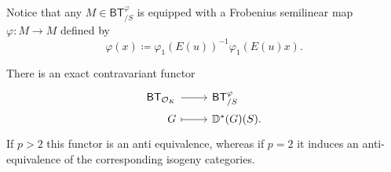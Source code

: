 \documentclass[../Main]{subfiles}
\begin{document}
\noindent
Notice that any $M \in \mathsf{BT}^{\varphi}_{/S}$ is equipped with a Frobenius
semilinear map $\varphi\colon M \to M$ defined by
\begin{equation*}
	\varphi (x) \coloneqq \varphi_1 \left( E(u) \right)^{-1} \varphi_1 (E(u)x)
.\end{equation*}


\begin{prop}
	There is an exact contravariant functor
	\begin{equation*}
	\begin{tikzcd}[row sep = 0ex
		,/tikz/column 1/.append style={anchor=base east}
		,/tikz/column 2/.append style={anchor=base west}]
		\mathsf{BT}_{\mathcal{O}_{ K }} \arrow[r, "", rightarrow] &
		\mathsf{BT}^{\varphi}_{/S} \\
		G \arrow[r, "", mapsto] & 
		\mathbb{D}^*(G)(S)
	.\end{tikzcd}
	\end{equation*} 
	If $p > 2$ this functor is an anti equivalence,
	whereas if $p = 2$ it induces an anti-equivalence of the 
	corresponding isogeny categories.
\end{prop}
\end{document}
